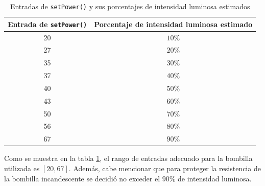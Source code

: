 \begin{table}[H]
\centering
\begin{tabular}{|c|c|}
\hline
\textbf{Entrada de \texttt{setPower()}} & \textbf{Porcentaje de intensidad luminosa estimado} \\ \hline
20                                                       & $10\%$                                               \\ \hline
27                                                       & $20\%$                                              \\ \hline
35                                                       & $30\%$                                              \\ \hline
37                                                       & $40\%$                                              \\ \hline
40                                                       & $50\%$                                              \\ \hline
43                                                       & $60\%$                                              \\ \hline
50                                                       & $70\%$                                              \\ \hline
56                                                       & $80\%$                                              \\ \hline
67                                                       & $90\%$                                              \\ \hline
\end{tabular}
\caption{Entradas de \texttt{setPower()} y sus porcentajes de intensidad luminosa estimados}
\label{porc}
\end{table}

\vspace*{-0.3cm}

Como se muestra en la tabla \ref{porc}, el rango de entradas adecuado para la bombilla utilizada es $[20,67]$. Además, cabe mencionar que para proteger la resistencia de la bombilla incandescente se decidió no exceder el $90\%$ de intensidad luminosa.

